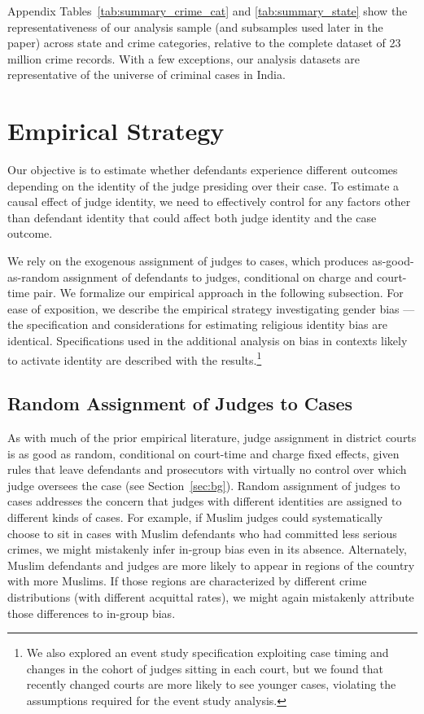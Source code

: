 \documentclass[12pt,english]{article}
\begin{document}
Appendix Tables~\ref{tab:summary_crime_cat} and \ref{tab:summary_state} show the representativeness of our analysis sample (and subsamples used later in the paper) across state and crime categories, relative to the complete dataset of 23 million crime records. With a few exceptions, our analysis datasets are representative of the universe of criminal cases in India.

\section{Empirical Strategy}
\label{sec:strategy}

Our objective is to estimate whether defendants experience different outcomes depending on the identity of the judge presiding over their case. To estimate a causal effect of judge identity, we need to effectively control for any factors other than defendant identity that could affect both judge identity and the case outcome. 

We rely on the exogenous assignment of judges to cases, which produces as-good-as-random assignment of defendants to judges, conditional on charge and court-time pair. We formalize our empirical approach in the following subsection. For ease of exposition, we describe the empirical strategy investigating gender bias --- the specification and considerations for estimating religious identity bias are identical. Specifications used in the additional analysis on bias in contexts likely to activate identity are described with the results.\footnote{We also explored an event study specification exploiting case timing and changes in the cohort of judges sitting in each court, but we found that recently changed courts are more likely to see younger cases, violating the assumptions required for the event study analysis.}

\subsection{Random Assignment of Judges to Cases}

As with much of the prior empirical literature, judge assignment in district courts is as good as random, conditional on court-time and charge fixed effects, given rules that leave defendants and prosecutors with virtually no control over which judge oversees the case (see Section~\ref{sec:bg}). Random assignment of judges to cases addresses the concern that judges with different identities are assigned to different kinds of cases. For example, if Muslim judges could systematically choose to sit in cases with Muslim defendants who had committed less serious crimes, we might mistakenly infer in-group bias even in its absence. Alternately, Muslim defendants and judges are more likely to appear in regions of the country with more Muslims. If those regions are characterized by different crime distributions (with different acquittal rates), we might again mistakenly attribute those differences to in-group bias.
\end{document}
